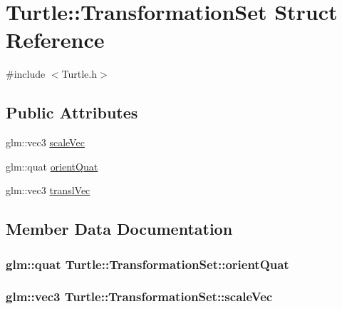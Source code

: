 \hypertarget{struct_turtle_1_1_transformation_set}{}\section{Turtle\+:\+:Transformation\+Set Struct Reference}
\label{struct_turtle_1_1_transformation_set}


{\ttfamily \#include $<$Turtle.\+h$>$}

\subsection*{Public Attributes}
\begin{DoxyCompactItemize}
\item 
glm\+::vec3 \hyperlink{struct_turtle_1_1_transformation_set_a7e3907098175f964af8ffb88e1206f6a}{scale\+Vec}
\item 
glm\+::quat \hyperlink{struct_turtle_1_1_transformation_set_a7dffc2b5fb9511640e171b1fbdc4ac10}{orient\+Quat}
\item 
glm\+::vec3 \hyperlink{struct_turtle_1_1_transformation_set_aa6c7ef2414c618090e25d89574cc4af7}{transl\+Vec}
\end{DoxyCompactItemize}


\subsection{Member Data Documentation}
\subsubsection[{\texorpdfstring{orient\+Quat}{orientQuat}}]{\setlength{\rightskip}{0pt plus 5cm}glm\+::quat Turtle\+::\+Transformation\+Set\+::orient\+Quat}\hypertarget{struct_turtle_1_1_transformation_set_a7dffc2b5fb9511640e171b1fbdc4ac10}{}\label{struct_turtle_1_1_transformation_set_a7dffc2b5fb9511640e171b1fbdc4ac10}
\subsubsection[{\texorpdfstring{scale\+Vec}{scaleVec}}]{\setlength{\rightskip}{0pt plus 5cm}glm\+::vec3 Turtle\+::\+Transformation\+Set\+::scale\+Vec}\hypertarget{struct_turtle_1_1_transformation_set_a7e3907098175f964af8ffb88e1206f6a}{}\label{struct_turtle_1_1_transformation_set_a7e3907098175f964af8ffb88e1206f6a}
